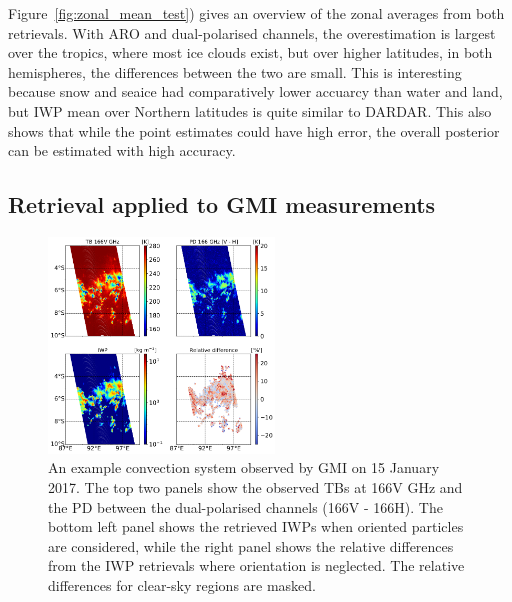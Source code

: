 \documentclass[amt, manuscript]{copernicus}
\begin{document}
Figure~\ref{fig:zonal_mean_test}) gives an overview of the zonal averages from both retrievals. With ARO and dual-polarised channels, the overestimation is largest over the tropics, where most ice clouds exist, but over higher latitudes, in both hemispheres, the differences between the two are small. This is interesting because snow and seaice had comparatively lower accuarcy than water and land, but IWP mean over Northern latitudes is quite similar to DARDAR. This also shows that while the point estimates could have high error, the overall posterior can be estimated with high accuracy. 



\subsection{Retrieval applied to GMI measurements}
\label{sec:IWP_GMI}

\begin{figure}[t]
	\includegraphics[width=6cm]{Figures/example1_tropics_gmi.png}
	\caption{ An example convection system observed by GMI on 15 January 2017. The top two panels show the observed TBs at 166V\,\,GHz and the PD between the dual-polarised channels (166V - 166H). The bottom left panel shows the retrieved IWPs when oriented particles are considered, while the right panel shows the relative differences from the IWP retrievals where orientation is neglected. The relative differences for clear-sky regions are masked.}
	\label{fig:example1_GMI}
\end{figure}

\end{document}

